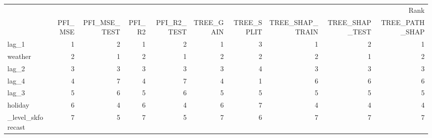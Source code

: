 \begin{tabular}{lrrrrrrrrr}
\toprule
 & \multicolumn{9}{r}{Rank} \\
 & PFI_MSE & PFI_MSE_TEST & PFI_R2 & PFI_R2_TEST & TREE_GAIN & TREE_SPLIT & TREE_SHAP_TRAIN & TREE_SHAP_TEST & TREE_PATH_SHAP \\
\midrule
lag_1 & 1 & 2 & 1 & 2 & 1 & 3 & 1 & 2 & 1 \\
weather & 2 & 1 & 2 & 1 & 2 & 2 & 2 & 1 & 2 \\
lag_2 & 3 & 3 & 3 & 3 & 3 & 4 & 3 & 3 & 3 \\
lag_4 & 4 & 7 & 4 & 7 & 4 & 1 & 6 & 6 & 6 \\
lag_3 & 5 & 6 & 5 & 6 & 5 & 5 & 5 & 5 & 5 \\
holiday & 6 & 4 & 6 & 4 & 6 & 7 & 4 & 4 & 4 \\
_level_skforecast & 7 & 5 & 7 & 5 & 7 & 6 & 7 & 7 & 7 \\
\bottomrule
\end{tabular}
